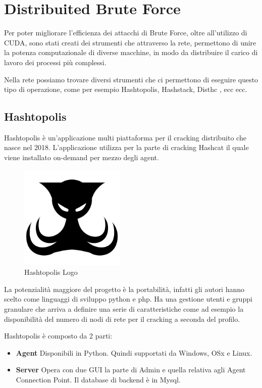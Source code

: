\chapter{Distribuited Brute Force}

Per poter migliorare l'efficienza dei attacchi di Brute Force, oltre all'utilizzo di CUDA, sono stati creati dei strumenti che attraverso la rete, permettono di unire la potenza computazionale di diverse macchine, in modo da distribuire il carico di lavoro dei processi più complessi.

Nella rete possiamo trovare diversi strumenti che ci permettono di eseguire questo tipo di operazione, come per esempio Hashtopolis, Hashstack, Disthc , ecc ecc.

\section{Hashtopolis}

Hashtopolis \cite{hashtopolis} è un'applicazione multi piattaforma per il cracking distribuito che nasce nel 2018. L’applicazione utilizza per la parte di cracking Hashcat il quale viene installato on-demand per mezzo degli agent. 

\begin{figure}[ht]
    \centering
    \includegraphics[width=50mm]{Immagini/8/hashtopoli_logo.png}
    \caption{Hashtopolis Logo}
\end{figure}

La potenzialità maggiore del progetto è la portabilità, infatti gli autori hanno scelto come linguaggi di sviluppo python e php. Ha una gestione utenti e gruppi granulare che arriva a definire una serie di caratteristiche come ad esempio la disponibilità del numero di nodi di rete per il cracking a seconda del profilo.

Hashtopolis è composto da 2 parti:

\begin{itemize}
    \item \textbf{Agent} Disponibili in Python. Quindi supportati da Windows, OSx e Linux.
    \item \textbf{Server} Opera con due GUI la parte di Admin e quella relativa agli Agent Connection Point. Il database di backend è in Mysql.
\end{itemize}

